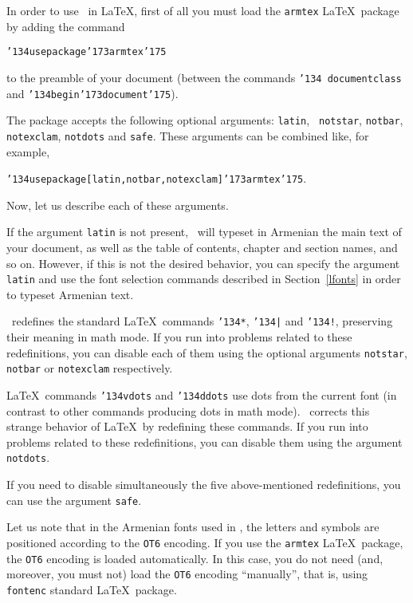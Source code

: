 \documentclass[12pt,a4paper,draft]{article}
\def\mybs{\char'134}
\def\mylbrace{\char'173}
\def\myrbrace{\char'175}
\def\myindent{\leavevmode}
\begin{document}
\myindent In order to use \latArmTeX\ in \LaTeX, first of all you must load
the {\tt armtex} \LaTeX\ package by adding the command

{\tt \mybs usepackage\mylbrace armtex\myrbrace}

\noindent to the preamble of your document (between the commands {\tt \mybs
  documentclass} and {\tt \mybs begin\mylbrace document\myrbrace}).

The package accepts the following optional arguments: {\tt latin}, {\tt
  notstar}, {\tt notbar}, {\tt notexclam}, {\tt notdots} and {\tt safe}. These
arguments can be combined like, for example,

{\tt \mybs usepackage[latin,notbar,notexclam]\mylbrace armtex\myrbrace}\qquad.

Now, let us describe each of these arguments.

If the argument {\tt latin} is not present, \latArmTeX\ will typeset in
Armenian the main text of your document, as well as the table of contents,
chapter and section names, and so on. However, if this is not the desired
behavior, you can specify the argument {\tt latin} and use the font selection
commands described in Section~\ref{lfonts} in order to typeset Armenian text.

\latArmTeX\ redefines the standard \LaTeX\ commands {\tt \mybs*}, {\tt \mybs|}
and {\tt \mybs!}, preserving their meaning in math mode. If you run into
problems related to these redefinitions, you can disable each of them using
the optional arguments {\tt notstar}, {\tt notbar} or {\tt notexclam}
respectively.

\LaTeX\ commands {\tt \mybs vdots} and {\tt \mybs ddots} use dots from the
current font (in contrast to other commands producing dots in math
mode). \latArmTeX\ corrects this strange behavior of \LaTeX\ by redefining
these commands. If you run into problems related to these redefinitions, you
can disable them using the argument {\tt notdots}.

If you need to disable simultaneously the five above-mentioned redefinitions,
you can use the argument {\tt safe}.

Let us note that in the Armenian fonts used in \latArmTeX, the letters and
symbols are positioned according to the {\tt OT6} encoding. If you use the
{\tt armtex} \LaTeX\ package, the {\tt OT6} encoding is loaded
automatically. In this case, you do not need (and, moreover, you must not)
load the {\tt OT6} encoding ``manually'', that is, using {\tt fontenc}
standard \LaTeX\ package.
\end{document}
